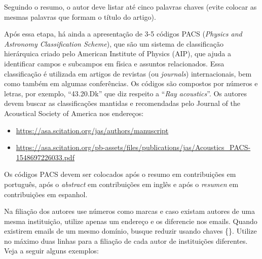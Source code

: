 \documentclass[12pt, a4paper, twoside, twocolumn]{article}
\begin{document}
Seguindo o resumo, o autor deve listar até cinco palavras chaves (evite colocar as mesmas palavras que formam o título do artigo).

Após essa etapa, há ainda a apresentação de 3-5 códigos PACS (\textit{Physics and Astronomy Classification Scheme}), que são um sistema de classificação hierárquica criado pelo American Institute of Physics (AIP), que ajuda a identificar campos e subcampos em física e assuntos relacionados. Essa classificação é utilizada em artigos de revistas (ou \textit{journals}) internacionais, bem como também em algumas conferências. Os códigos são compostos por números e letras, por exemplo, ``43.20.Dk'' que diz respeito a ``\textit{Ray acoustics}''. Os autores devem buscar as classificações mantidas e recomendadas pelo Journal of the Acoustical Society of America nos endereços:

\begin{itemize}[noitemsep,topsep=-1ex] \itemsep=8pt
	\item \url{https://asa.scitation.org/jas/authors/manuscript}
	\item \url{https://asa.scitation.org/pb-assets/files/publications/jas/Acoustics_PACS-1548697226033.pdf}
\end{itemize}
%

\pagebreak
Os códigos PACS devem ser colocados após o resumo em contribuições em português, após o \textit{abstract} em contribuições em inglês e após o \textit{resumen} em contribuições em espanhol.

Na filiação dos autores use números como marcas e caso existam autores de uma mesma instituição, utilize apenas um endereço e os diferencie nos emails. Quando existirem emails de um mesmo domínio, busque reduzir usando chaves \{\}. Utilize no máximo duas linhas para a filiação de cada autor de instituições diferentes. Veja a seguir alguns  exemplos:
\end{document}
